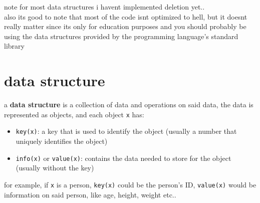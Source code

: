 \documentclass[a4paper,12pt]{article}
\begin{document}
\newenvironment{note}
  {\begin{bclogo}[logo=\bcinfo, couleurBarre=orange, couleur=lightgray]{ note}}
  {\end{bclogo}}
\newenvironment{attention}
  {\begin{bclogo}[logo=\bcattention, couleurBarre=red, noborder=true, 
                couleur=red!15]{Important!}}
  {\end{bclogo}}

\begin{note}
for most data structures i havent implemented deletion yet..\\[0pt]
also its good to note that most of the code isnt optimized to hell, but it doesnt really matter since its only for education purposes and you should probably be using the data structures provided by the programming language's standard library\\[0pt]
\end{note}

\section{data structure}
\label{sec:org8f50ccd}
\begin{definition}
a \textbf{data structure} is a collection of data and operations on said data, the data is represented as objects, and each object \texttt{x} has:\\[0pt]
\begin{itemize}
\item \texttt{key(x)}: a key that is used to identify the object (usually a number that uniquely identifies the object)\\[0pt]
\item \texttt{info(x)} or \texttt{value(x)}: contains the data needed to store for the object (usually without the key)\\[0pt]
\end{itemize}
\begin{my_example}
for example, if \texttt{x} is a person, \texttt{key(x)} could be the person's ID, \texttt{value(x)} would be information on said person, like age, height, weight etc..\\[0pt]
\end{my_example}
\end{definition}
\end{document}
